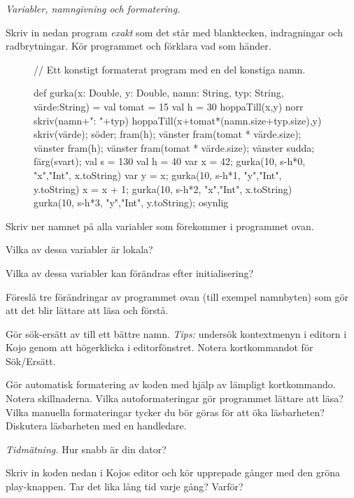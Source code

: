 \Task \emph{Variabler, namngivning och formatering.}

\Subtask Skriv in nedan program \emph{exakt} som det står med blanktecken, indragningar och radbrytningar. Kör programmet och förklara vad som händer.

\begin{figure}
\begin{Code}
// Ett konstigt formaterat program med en del konstiga namn.

  def gurka(x: Double,
y: Double, namn: String,
          typ: String,
     värde:String) = {
  val tomat = 15
  val h = 30
       hoppaTill(x,y)
  norr
  skriv(namn+": "+typ)
  hoppaTill(x+tomat*(namn.size+typ.size),y)
  skriv(värde); söder; fram(h); vänster
  fram(tomat * värde.size); vänster
  fram(h); vänster
  fram(tomat * värde.size); vänster }
sudda; färg(svart); val s = 130
val h = 40
var x = 42; gurka(10, s-h*0, "x","Int", x.toString)
var y = x;  gurka(10, s-h*1, "y","Int", y.toString)
x = x + 1;  gurka(10, s-h*2, "x","Int", x.toString)
            gurka(10, s-h*3, "y","Int", y.toString); osynlig
\end{Code}
\end{figure}

\Subtask\Pen Skriv ner namnet på alla variabler som förekommer i programmet ovan.

\Subtask\Pen Vilka av dessa variabler är lokala?

\Subtask\Pen Vilka av dessa variabler kan förändras efter initialisering?

\Subtask\Pen Föreslå tre förändringar av programmet ovan (till exempel namnbyten) som gör att det blir lättare att läsa och förstå.

\Subtask Gör sök-ersätt av  till ett bättre namn. \emph{Tips:} undersök kontextmenyn i editorn i Kojo genom att högerklicka i editorfönstret. Notera kortkommandot för Sök/Ersätt.

\Subtask Gör automatisk formatering av koden med hjälp av lämpligt kortkommando. Notera skillnaderna. Vilka autoformateringar gör programmet lättare att läsa? Vilka manuella formateringar tycker du bör göras för att öka läsbarheten? Diskutera läsbarheten med en handledare.



\Task \label{task:measuretime} \emph{Tidmätning.} Hur snabb är din dator?

\Subtask \label{task:timer} Skriv in koden nedan i Kojos editor och kör upprepade gånger med den gröna play-knappen. Tar det lika lång tid varje gång? Varför?

